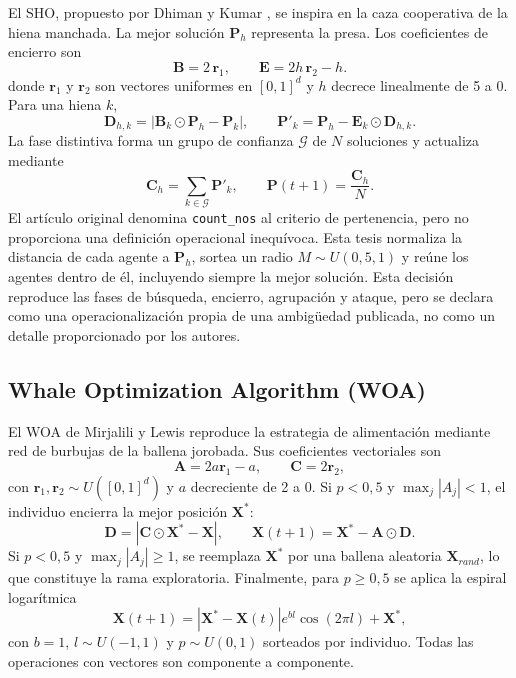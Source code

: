 El SHO, propuesto por Dhiman y Kumar \cite{Dhiman2017SHO}, se inspira en la caza cooperativa de la hiena manchada. La mejor solución $\mathbf P_h$ representa la presa. Los coeficientes de encierro son
\begin{equation}
\mathbf{B} = 2\,\mathbf{r}_1, \qquad \mathbf{E} = 2h\,\mathbf{r}_2 - h.
\end{equation}
donde $\mathbf r_1$ y $\mathbf r_2$ son vectores uniformes en $[0,1]^d$ y $h$ decrece linealmente de 5 a 0. Para una hiena $k$,
\begin{equation}
\mathbf D_{h,k}=\left|\mathbf B_k\odot\mathbf P_h-\mathbf P_k\right|,
\qquad
\mathbf P'_k=\mathbf P_h-\mathbf E_k\odot\mathbf D_{h,k}.
\end{equation}
La fase distintiva forma un grupo de confianza $\mathcal G$ de $N$ soluciones y actualiza mediante
\begin{equation}
\mathbf C_h=\sum_{k\in\mathcal G}\mathbf P'_k,
\qquad
\mathbf P(t+1)=\frac{\mathbf C_h}{N}.
\end{equation}
El artículo original denomina \texttt{count\_nos} al criterio de pertenencia, pero no proporciona una definición operacional inequívoca. Esta tesis normaliza la distancia de cada agente a $\mathbf P_h$, sortea un radio $M\sim U(0{,}5,1)$ y reúne los agentes dentro de él, incluyendo siempre la mejor solución. Esta decisión reproduce las fases de búsqueda, encierro, agrupación y ataque, pero se declara como una operacionalización propia de una ambigüedad publicada, no como un detalle proporcionado por los autores.

\subsection{Whale Optimization Algorithm (WOA)}

El WOA de Mirjalili y Lewis \cite{Mirjalili2016WOA} reproduce la estrategia de alimentación mediante red de burbujas de la ballena jorobada. Sus coeficientes vectoriales son
\begin{equation}
\mathbf A=2a\mathbf r_1-a,\qquad \mathbf C=2\mathbf r_2,
\end{equation}
con $\mathbf r_1,\mathbf r_2\sim U([0,1]^d)$ y $a$ decreciente de 2 a 0. Si $p<0{,}5$ y $\max_j|A_j|<1$, el individuo encierra la mejor posición $\mathbf X^*$:
\begin{equation}
\mathbf D=|\mathbf C\odot\mathbf X^*-\mathbf X|,
\qquad \mathbf X(t+1)=\mathbf X^*-\mathbf A\odot\mathbf D.
\end{equation}
Si $p<0{,}5$ y $\max_j|A_j|\geq1$, se reemplaza $\mathbf X^*$ por una ballena aleatoria $\mathbf X_{rand}$, lo que constituye la rama exploratoria. Finalmente, para $p\geq0{,}5$ se aplica la espiral logarítmica
\begin{equation}
\mathbf{X}(t+1) = \left| \mathbf{X}^{*} - \mathbf{X}(t) \right| e^{bl}\cos(2\pi l) + \mathbf{X}^{*},
\end{equation}
con $b=1$, $l\sim U(-1,1)$ y $p\sim U(0,1)$ sorteados por individuo. Todas las operaciones con vectores son componente a componente.

